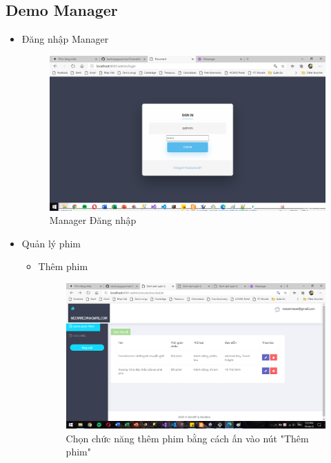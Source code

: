 \documentclass[a4paper, 12pt]{article}
\begin{document}
\subsection{Demo Manager}
\begin{itemize}
	\item Đăng nhập Manager
	\begin{figure}[H]
		\begin{center}
			\includegraphics[scale=0.5]{./image/demo_adminLogin.png}
			\caption{Manager Đăng nhập}
		\end{center}
	\end{figure}

	\item Quản lý phim
	\begin{itemize}
		\item Thêm phim
			\begin{figure}[H]
				\begin{center}
					\includegraphics[scale=0.5]{./image/demo_managerAddMovie.png}
					\caption{Chọn chức năng thêm phim bằng cách ấn vào nút "Thêm phim"}
				\end{center}
			\end{figure}
	

\end{itemize}
\end{itemize}
\end{document}
